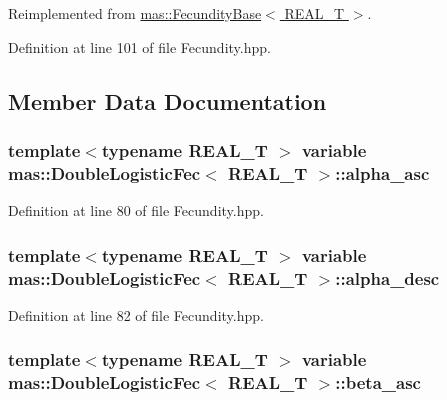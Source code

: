 Reimplemented from \hyperlink{structmas_1_1_fecundity_base_a5a0ca3b02791910dd012a30f1c2bf2a8}{mas\-::\-Fecundity\-Base$<$ R\-E\-A\-L\-\_\-\-T $>$}.



Definition at line 101 of file Fecundity.\-hpp.



\subsection{Member Data Documentation}
\hypertarget{structmas_1_1_double_logistic_fec_a842802b2a752f90e7573f64c39f804b1}{
\subsubsection[{alpha\-\_\-asc}]{\setlength{\rightskip}{0pt plus 5cm}template$<$typename R\-E\-A\-L\-\_\-\-T $>$ {\bf variable} {\bf mas\-::\-Double\-Logistic\-Fec}$<$ R\-E\-A\-L\-\_\-\-T $>$\-::alpha\-\_\-asc}}\label{structmas_1_1_double_logistic_fec_a842802b2a752f90e7573f64c39f804b1}


Definition at line 80 of file Fecundity.\-hpp.

\hypertarget{structmas_1_1_double_logistic_fec_a62ce4cb22c93f6a2fac67c7ab129749d}{
\subsubsection[{alpha\-\_\-desc}]{\setlength{\rightskip}{0pt plus 5cm}template$<$typename R\-E\-A\-L\-\_\-\-T $>$ {\bf variable} {\bf mas\-::\-Double\-Logistic\-Fec}$<$ R\-E\-A\-L\-\_\-\-T $>$\-::alpha\-\_\-desc}}\label{structmas_1_1_double_logistic_fec_a62ce4cb22c93f6a2fac67c7ab129749d}


Definition at line 82 of file Fecundity.\-hpp.

\hypertarget{structmas_1_1_double_logistic_fec_a60a24a306e30464e33b1884fc53a1435}{
\subsubsection[{beta\-\_\-asc}]{\setlength{\rightskip}{0pt plus 5cm}template$<$typename R\-E\-A\-L\-\_\-\-T $>$ {\bf variable} {\bf mas\-::\-Double\-Logistic\-Fec}$<$ R\-E\-A\-L\-\_\-\-T $>$\-::beta\-\_\-asc}}\label{structmas_1_1_double_logistic_fec_a60a24a306e30464e33b1884fc53a1435}


